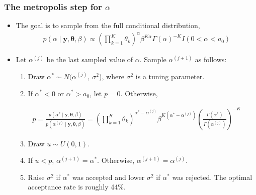 \documentclass[handout]{beamer}
\providecommand{\vc}[1]{\boldsymbol{#1}}
\numberwithin{equation}{section}
\begin{document}
\begin{frame}
\frametitle{The metropolis step for $\alpha$}
\begin{itemize} \scriptsize
\item The goal is to sample from the full conditional distribution,
\begin{align*}
p(\alpha \mid \vc{y}, \vc{\theta}, \beta) \propto \left ( \prod_{k = 1}^K \theta_k \right )^\alpha \beta^{K \alpha} \Gamma(\alpha)^{-K} I(0 < \alpha < a_0)
\end{align*}
\pause \item Let $\alpha^{(j)}$ be the last sampled value of $\alpha$. Sample $\alpha^{(j + 1)}$ as follows:

\begin{enumerate} \scriptsize
\pause \item Draw $\alpha^* \sim N(\alpha^{(j)}, \ \sigma^2$), where $\sigma^2$ is a tuning parameter.
\pause \item If $\alpha^* < 0$ or $\alpha^* > a_0$, let $p = 0$. Otherwise,
\end{enumerate}

\pause \begin{align*}
p = \frac{p(\alpha^* \mid \vc{y}, \vc{\theta}, \beta)}{p(\alpha^{(j)} \mid \vc{y}, \vc{\theta}, \beta)} = \left ( \prod_{k = 1}^K \theta_k \right )^{\alpha^* - \alpha^{(j)}} \beta^{K(\alpha^* - \alpha^{(j)})} \left( \frac{\Gamma(\alpha^*)}{\Gamma(\alpha^{(j)})} \right )^{-K}
\end{align*}
\begin{enumerate} \setcounter{enumi}{2} \scriptsize
\pause \item Draw $u \sim U(0, 1)$.
\pause \item If $u < p$, $\alpha^{(j + 1)} = \alpha^*$. Otherwise, $\alpha^{(j + 1)} = \alpha^{(j)}$.
\pause \item Raise $\sigma^2$ if $\alpha^*$ was accepted and lower $\sigma^2$ if $\alpha^*$ was rejected. The optimal acceptance rate is roughly 44\%.
\end{enumerate}
\end{itemize}
\end{frame}
\end{document}
